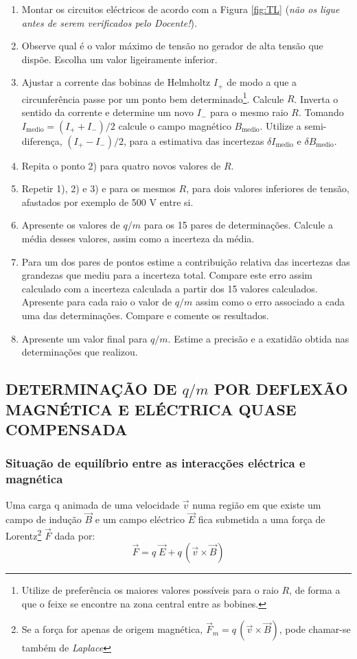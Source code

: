 \documentclass[a4paper,twoside,12pt]{article}      %
\begin{document}
\begin{enumerate}
	\item Montar os circuitos eléctricos de acordo com a  Figura \ref{fig:TL} 
	(\emph{não os ligue antes de serem verificados pelo Docente!}).
	\item Observe qual é o valor máximo de tensão no gerador de  alta tensão que dispõe. Escolha um valor ligeiramente inferior.
	\item Ajustar a corrente das bobinas de Helmholtz $I_+$ de modo a que a circunferência passe por um ponto bem determinado\footnote{Utilize de preferência os maiores valores possíveis para o raio $R$, de forma a que o feixe se encontre na zona central entre as bobines.}.  Calcule $R$.
	Inverta o sentido da corrente e determine um novo $I_-$ para o mesmo raio $R$.
	Tomando $I_{\textrm{medio}} = (I_+ + I_-)/2 $ calcule o campo magnético $B_{\textrm{medio}}$. Utilize a semi-diferença, $(I_+ - I_-)/2$, para a estimativa das incertezas $\delta I_{\textrm{medio}}$ e $\delta B_{\textrm{medio}}$.
	\item Repita o ponto 2) para quatro novos valores de $R$. 
	\item Repetir 1), 2) e 3)  e para os mesmos $R$, para dois valores inferiores de tensão, afastados por exemplo de 500 V entre si.
	\item Apresente os valores de $q/m$ para os 15 pares de determinações. Calcule a média desses valores, assim como a incerteza da média.
	\item Para um dos pares de pontos estime a contribuição relativa das incertezas das grandezas que mediu para a incerteza total. Compare este erro assim calculado com a incerteza calculada a partir dos 15 valores calculados.
	Apresente para cada raio o valor de $q/m$ assim como o erro associado a cada uma das determinações. Compare e comente os resultados.
	\item Apresente um valor final para $q/m$. Estime a precisão e a exatidão obtida nas determinações que realizou.
\end{enumerate}
 
\subsection{\sf DETERMINAÇÃO DE $q/m$ POR DEFLEXÃO\\ MAGNÉTICA E ELÉCTRICA QUASE COMPENSADA }

\subsubsection{\sf Situação de equilíbrio entre as interacções eléctrica e magnética}
Uma carga q animada de uma velocidade $\vec{v}$ numa região em que existe um campo de indução $\vec{B}$ e um campo eléctrico $\vec{E}$ fica submetida a uma força de Lorentz\footnote{Se a força for apenas de origem magnética, $\vec{F}_m =  q\,(\vec{v} \times \vec{B})$, pode chamar-se também de \emph{Laplace}} $\vec{F}$ dada por:
\begin{equation}
	\label{eq:Lorentz}
 \vec{F} = q\; \vec{E} + q\,(\vec{v} \times \vec{B})
\end{equation}
\end{document}
